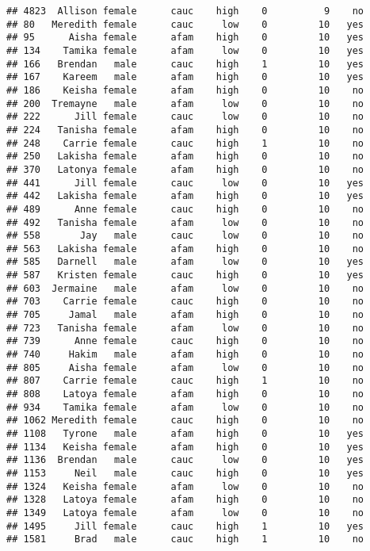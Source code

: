 \documentclass[
]{article}
\begin{document}
\begin{verbatim}
## 4823  Allison female      cauc    high    0          9    no
## 80   Meredith female      cauc     low    0         10   yes
## 95      Aisha female      afam    high    0         10   yes
## 134    Tamika female      afam     low    0         10   yes
## 166   Brendan   male      cauc    high    1         10   yes
## 167    Kareem   male      afam    high    0         10   yes
## 186    Keisha female      afam    high    0         10    no
## 200  Tremayne   male      afam     low    0         10    no
## 222      Jill female      cauc     low    0         10    no
## 224   Tanisha female      afam    high    0         10    no
## 248    Carrie female      cauc    high    1         10    no
## 250   Lakisha female      afam    high    0         10    no
## 370   Latonya female      afam    high    0         10    no
## 441      Jill female      cauc     low    0         10   yes
## 442   Lakisha female      afam    high    0         10   yes
## 489      Anne female      cauc    high    0         10    no
## 492   Tanisha female      afam     low    0         10    no
## 558       Jay   male      cauc     low    0         10    no
## 563   Lakisha female      afam    high    0         10    no
## 585   Darnell   male      afam     low    0         10   yes
## 587   Kristen female      cauc    high    0         10   yes
## 603  Jermaine   male      afam     low    0         10    no
## 703    Carrie female      cauc    high    0         10    no
## 705     Jamal   male      afam    high    0         10    no
## 723   Tanisha female      afam     low    0         10    no
## 739      Anne female      cauc    high    0         10    no
## 740     Hakim   male      afam    high    0         10    no
## 805     Aisha female      afam     low    0         10    no
## 807    Carrie female      cauc    high    1         10    no
## 808    Latoya female      afam    high    0         10    no
## 934    Tamika female      afam     low    0         10    no
## 1062 Meredith female      cauc    high    0         10    no
## 1108   Tyrone   male      afam    high    0         10   yes
## 1134   Keisha female      afam    high    0         10   yes
## 1136  Brendan   male      cauc     low    0         10   yes
## 1153     Neil   male      cauc    high    0         10   yes
## 1324   Keisha female      afam     low    0         10    no
## 1328   Latoya female      afam    high    0         10    no
## 1349   Latoya female      afam     low    0         10    no
## 1495     Jill female      cauc    high    1         10   yes
## 1581     Brad   male      cauc    high    1         10    no

\end{verbatim}
\end{document}
